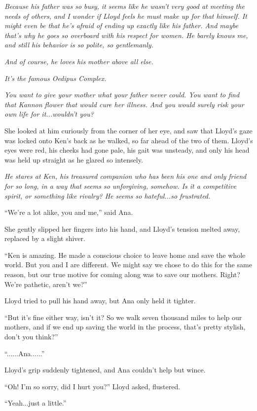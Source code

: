 \documentclass[
]{article}
\begin{document}
\emph{Because his father was so busy, it seems like he wasn't very good
at meeting the needs of others, and I wonder if Lloyd feels he must make
up for that himself. It might even be that he's afraid of ending up
exactly like his father. And maybe that's why he goes so overboard with
his respect for women. He barely knows me, and still his behavior is so
polite, so gentlemanly.}

\emph{And of course, he loves his mother above all else.}

\emph{It's the famous Oedipus Complex.}

\emph{You want to give your mother what your father never could. You
want to find that Kannon flower that would cure her illness. And you
would surely risk your own life for it...wouldn't you?}

She looked at him curiously from the corner of her eye, and saw that
Lloyd's gaze was locked onto Ken's back as he walked, so far ahead of
the two of them. Lloyd's eyes were red, his cheeks had gone pale, his
gait was unsteady, and only his head was held up straight as he glared
so intensely.

\emph{He stares at Ken, his treasured companion who has been his one and
only friend for so long, in a way that seems so unforgiving, somehow. Is
it a competitive spirit, or something like rivalry? He seems so
hateful...so frustrated.}

``We're a lot alike, you and me,'' said Ana.

She gently slipped her fingers into his hand, and Lloyd's tension melted
away, replaced by a slight shiver.

``Ken is amazing. He made a conscious choice to leave home and save the
whole world. But you and I are different. We might say we chose to do
this for the same reason, but our true motive for coming along was to
save our mothers. Right? We're pathetic, aren't we?''

Lloyd tried to pull his hand away, but Ana only held it tighter.

``But it's fine either way, isn't it? So we walk seven thousand miles to
help our mothers, and if we end up saving the world in the process,
that's pretty stylish, don't you think?''

``......Ana......''

Lloyd's grip suddenly tightened, and Ana couldn't help but wince.

``Oh! I'm so sorry, did I hurt you?'' Lloyd asked, flustered.

``Yeah...just a little.''
\end{document}
